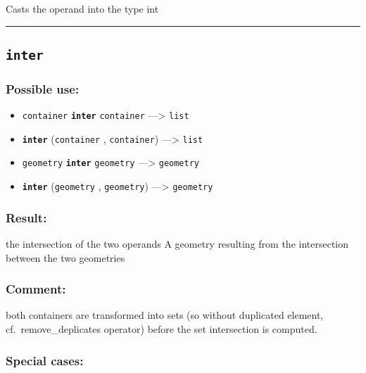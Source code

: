 \documentclass[]{book}
\providecommand{\tightlist}{%
  \setlength{\itemsep}{0pt}\setlength{\parskip}{0pt}}
\theoremstyle{definition}
\theoremstyle{definition}
\theoremstyle{definition}
\theoremstyle{remark}
\begin{document}
Casts the operand into the type int

\begin{center}\rule{0.5\linewidth}{\linethickness}\end{center}

\subsection{\texorpdfstring{\texttt{inter}}{inter}}\label{inter}

\subsubsection{Possible use:}\label{possible-use-277}

\begin{itemize}
\tightlist
\item
  \texttt{container} \textbf{\texttt{inter}} \texttt{container}
  ---\textgreater{} \texttt{list}
\item
  \textbf{\texttt{inter}} (\texttt{container} , \texttt{container})
  ---\textgreater{} \texttt{list}
\item
  \texttt{geometry} \textbf{\texttt{inter}} \texttt{geometry}
  ---\textgreater{} \texttt{geometry}
\item
  \textbf{\texttt{inter}} (\texttt{geometry} , \texttt{geometry})
  ---\textgreater{} \texttt{geometry}
\end{itemize}

\subsubsection{Result:}\label{result-267}

the intersection of the two operands A geometry resulting from the
intersection between the two geometries

\subsubsection{Comment:}\label{comment-53}

both containers are transformed into sets (so without duplicated
element, cf.~remove\_deplicates operator) before the set intersection is
computed.

\subsubsection{Special cases:}\label{special-cases-80}
\end{document}
